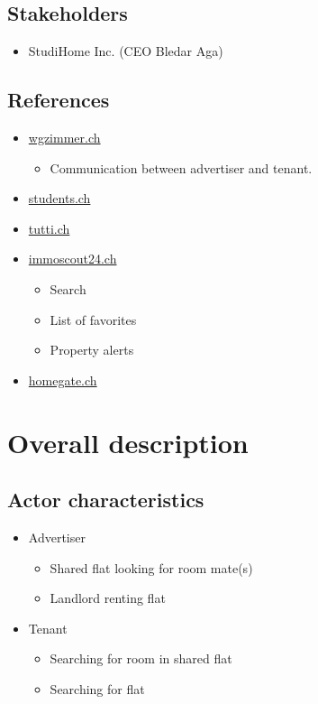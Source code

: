 \documentclass[a4paper,11pt]{article}
\begin{document}
\subsection*{Stakeholders}
\begin{itemize}
  \item StudiHome Inc. (CEO Bledar Aga)
\end{itemize}

\subsection*{References}
\begin{itemize}
  \item \href{www.wgzimmer.ch}{wgzimmer.ch}
  \begin{itemize}
    \item Communication between advertiser and tenant.
  \end{itemize}
  \item \href{http://www.students.ch/wohnen}{students.ch}
  \item \href{http://www.tutti.ch/ganze-schweiz/immobilien/wg-zimmer}{tutti.ch}
  \item \href{http://www.immoscout24.ch/}{immoscout24.ch}
  \begin{itemize}
    \item Search
    \item List of favorites
    \item Property alerts
  \end{itemize}
  \item \href{http://www.homegate.ch/}{homegate.ch}
\end{itemize}

\section{Overall description}
\subsection*{Actor characteristics}
\begin{itemize}
  \item Advertiser
    \begin{itemize}
      \item Shared flat looking for room mate(s)
      \item Landlord renting flat
    \end{itemize}
  \item Tenant
  \begin{itemize}
    \item Searching for room in shared flat
    \item Searching for flat
  \end{itemize}
\end{itemize}
\end{document}
